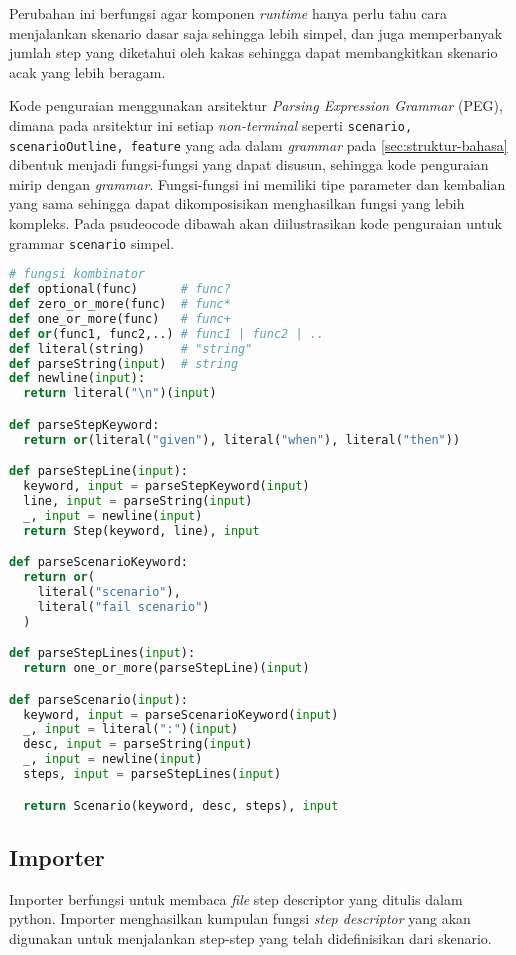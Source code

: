 Perubahan ini berfungsi agar komponen \emph{runtime} hanya perlu tahu cara menjalankan
skenario dasar saja sehingga lebih simpel, dan juga memperbanyak jumlah step yang diketahui
oleh kakas sehingga dapat membangkitkan skenario acak yang lebih beragam.

Kode penguraian menggunakan arsitektur \emph{Parsing Expression Grammar} (PEG), dimana
pada arsitektur ini setiap \emph{non-terminal} seperti \texttt{scenario, scenarioOutline, feature}
yang ada dalam \emph{grammar} pada \ref{sec:struktur-bahasa} dibentuk menjadi fungsi-fungsi
yang dapat disusun, sehingga kode penguraian mirip dengan \emph{grammar}. Fungsi-fungsi
ini memiliki tipe parameter dan kembalian yang sama sehingga
dapat dikomposisikan menghasilkan fungsi yang lebih kompleks. Pada psudeocode dibawah
akan diilustrasikan kode penguraian untuk grammar \texttt{scenario} simpel.

\begin{lstlisting}[language=python]
# fungsi kombinator
def optional(func)      # func?
def zero_or_more(func)  # func*
def one_or_more(func)   # func+
def or(func1, func2,..) # func1 | func2 | ..
def literal(string)     # "string"
def parseString(input)  # string
def newline(input):
  return literal("\n")(input)

def parseStepKeyword:
  return or(literal("given"), literal("when"), literal("then"))

def parseStepLine(input):
  keyword, input = parseStepKeyword(input)
  line, input = parseString(input)
  _, input = newline(input)
  return Step(keyword, line), input

def parseScenarioKeyword:
  return or(
    literal("scenario"),
    literal("fail scenario")
  )

def parseStepLines(input):
  return one_or_more(parseStepLine)(input)

def parseScenario(input):
  keyword, input = parseScenarioKeyword(input)
  _, input = literal(":")(input)
  desc, input = parseString(input)
  _, input = newline(input)
  steps, input = parseStepLines(input)

  return Scenario(keyword, desc, steps), input
\end{lstlisting}


\subsection{Importer}

Importer berfungsi untuk membaca \emph{file} step descriptor yang ditulis dalam python.
Importer menghasilkan kumpulan fungsi \emph{step descriptor} yang akan digunakan untuk
menjalankan step-step yang telah didefinisikan dari skenario.

